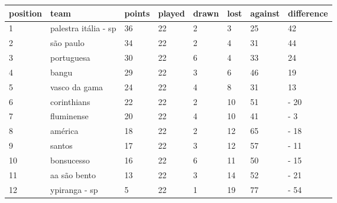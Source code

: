 \documentclass{article}
\begin{document}
\begin{tabular}{llllllll}
\toprule
position & team & points & played & drawn & lost & against & difference \\
\midrule
1 & palestra itália - sp & 36 & 22 & 2 & 3 & 25 & 42 \\
2 & são paulo & 34 & 22 & 2 & 4 & 31 & 44 \\
3 & portuguesa & 30 & 22 & 6 & 4 & 33 & 24 \\
4 & bangu & 29 & 22 & 3 & 6 & 46 & 19 \\
5 & vasco da gama & 24 & 22 & 4 & 8 & 31 & 13 \\
6 & corinthians & 22 & 22 & 2 & 10 & 51 & - 20 \\
7 & fluminense & 20 & 22 & 4 & 10 & 41 & - 3 \\
8 & américa & 18 & 22 & 2 & 12 & 65 & - 18 \\
9 & santos & 17 & 22 & 3 & 12 & 57 & - 11 \\
10 & bonsucesso & 16 & 22 & 6 & 11 & 50 & - 15 \\
11 & aa são bento & 13 & 22 & 3 & 14 & 52 & - 21 \\
12 & ypiranga - sp & 5 & 22 & 1 & 19 & 77 & - 54 \\
\bottomrule
\end{tabular}
\end{document}
